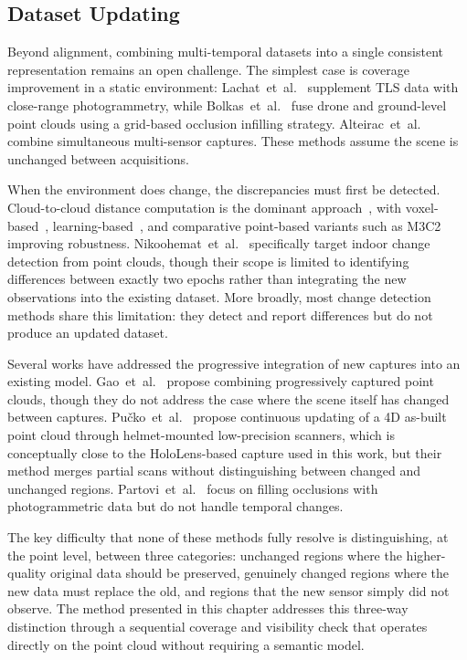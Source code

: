 \subsection{Dataset Updating}
\label{sec:4_rw_updating}

Beyond alignment, combining multi-temporal datasets into a single consistent representation remains an open challenge. The simplest case is coverage improvement in a static environment: Lachat~et~al.~\cite{lachat_combination_2016} supplement TLS data with close-range photogrammetry, while Bolkas~et~al.~\cite{bolkas_creating_2020} fuse drone and ground-level point clouds using a grid-based occlusion infilling strategy. Alteirac~et~al.~\cite{alteirac_registration_2021} combine simultaneous multi-sensor captures. These methods assume the scene is unchanged between acquisitions.

When the environment does change, the discrepancies must first be detected. Cloud-to-cloud distance computation is the dominant approach~\cite{mukupa_review_2017}, with voxel-based~\cite{hirt_change_2021}, learning-based~\cite{meyer_change_2022}, and comparative point-based variants such as M3C2~\cite{shirowzhan_comparative_2019} improving robustness. Nikoohemat~et~al.~\cite{nikoohemat_change_2018} specifically target indoor change detection from point clouds, though their scope is limited to identifying differences between exactly two epochs rather than integrating the new observations into the existing dataset. More broadly, most change detection methods share this limitation: they detect and report differences but do not produce an updated dataset.

Several works have addressed the progressive integration of new captures into an existing model. Gao~et~al.~\cite{gao_approach_2015} propose combining progressively captured point clouds, though they do not address the case where the scene itself has changed between captures. Pu\v{c}ko~et~al.~\cite{pucko_automated_2018} propose continuous updating of a 4D as-built point cloud through helmet-mounted low-precision scanners, which is conceptually close to the HoloLens-based capture used in this work, but their method merges partial scans without distinguishing between changed and unchanged regions. Partovi~et~al.~\cite{partovi_automatic_2021} focus on filling occlusions with photogrammetric data but do not handle temporal changes.

The key difficulty that none of these methods fully resolve is distinguishing, at the point level, between three categories: unchanged regions where the higher-quality original data should be preserved, genuinely changed regions where the new data must replace the old, and regions that the new sensor simply did not observe. The method presented in this chapter addresses this three-way distinction through a sequential coverage and visibility check that operates directly on the point cloud without requiring a semantic model.

